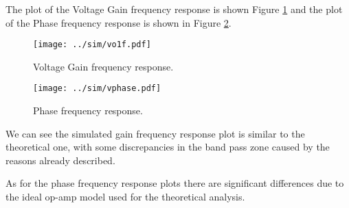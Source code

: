 The plot of the Voltage Gain frequency response is shown Figure \ref{fig:VG} and the plot of the Phase frequency response is shown in Figure \ref{fig:Phase}.

\begin{figure}[H] \centering
\texttt{[image: ../sim/vo1f.pdf]}
\caption{Voltage Gain frequency response.}
\label{fig:VG}
\end{figure}

\begin{figure}[H] \centering
\texttt{[image: ../sim/vphase.pdf]}
\caption{Phase frequency response.}
\label{fig:Phase}
\end{figure}

We can see the simulated gain frequency response plot is similar to the theoretical one, with some discrepancies in the band pass zone caused by the reasons already described.

 As for the phase frequency response plots there are significant differences due to the ideal op-amp model used for the theoretical analysis.



























